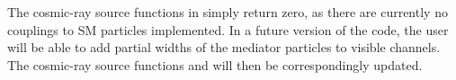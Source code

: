 \label{ch:vdSIDM_cr}

The cosmic-ray source functions in  simply return zero, as there are currently no 
couplings to SM particles implemented. In a future version of the code, the user will be able to
add partial widths of the mediator particles to visible channels. The  cosmic-ray source functions
 and  will then be correspondingly updated.